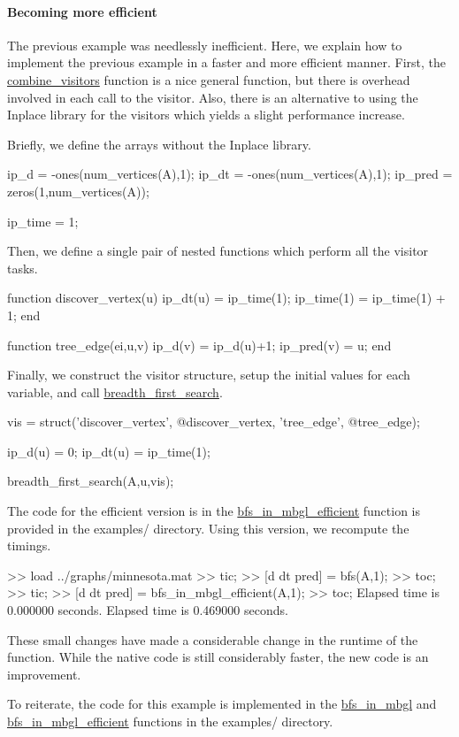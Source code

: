 \documentclass[12pt]{article}
\newcommand{\mycmd}[1]{\url{#1}}
\newcommand{\mypath}[1]{{\ttfamily \small #1}}
\begin{document}
\paragraph{Becoming more efficient} The previous example was needlessly inefficient.  Here, we explain how to implement the previous example in a faster and more efficient manner.  First, the \mycmd{combine_visitors} function is a nice general function, but there is overhead involved in each call to the visitor.  Also, there is an alternative to using the Inplace library for the visitors which yields a slight performance increase.

Briefly, we define the arrays without the Inplace library.
\begin{mcode}
ip_d = -ones(num_vertices(A),1);
ip_dt = -ones(num_vertices(A),1);
ip_pred = zeros(1,num_vertices(A));

ip_time = 1;
\end{mcode}
Then, we define a single pair of nested functions which perform all the visitor tasks.
\begin{mcode}
function discover_vertex(u)
    ip_dt(u) = ip_time(1);
    ip_time(1) = ip_time(1) + 1;
end

function tree_edge(ei,u,v)
    ip_d(v) = ip_d(u)+1;
    ip_pred(v) = u;
end
\end{mcode}
Finally, we construct the visitor structure, setup the initial values for each variable, and call \mycmd{breadth_first_search}.
\begin{mcode}
vis = struct('discover_vertex', @discover_vertex, 'tree_edge', @tree_edge);

ip_d(u) = 0;
ip_dt(u) = ip_time(1);

breadth_first_search(A,u,vis);
\end{mcode}
The code for the efficient version is in the \mycmd{bfs_in_mbgl_efficient} function is provided in the \mypath{examples/} directory.  Using this version, we recompute the timings.
\begin{mcode}
>> load ../graphs/minnesota.mat
>> tic;
>> [d dt pred] = bfs(A,1);
>> toc;
>> tic;
>> [d dt pred] = bfs_in_mbgl_efficient(A,1);
>> toc;
Elapsed time is 0.000000 seconds.
Elapsed time is 0.469000 seconds.
\end{mcode}
These small changes have made a considerable change in the runtime of the function.  While the native code is still considerably faster, the new code is an improvement.

To reiterate, the code for this example is implemented in the \mycmd{bfs_in_mbgl} and \mycmd{bfs_in_mbgl_efficient} functions in the \mypath{examples/} directory.
\end{document}
